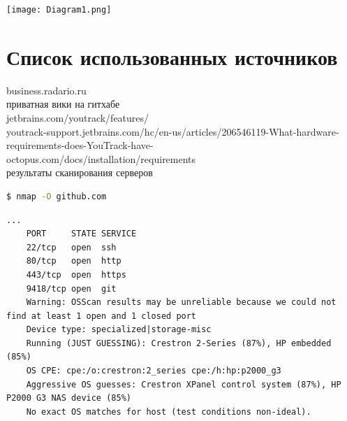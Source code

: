 \documentclass{article}
\begin{document}
\texttt{[image: Diagram1.png]}

\pagebreak

\section{Список использованных источников}
business.radario.ru\\
приватная вики на гитхабе\\
jetbrains.com/youtrack/features/\\
youtrack-support.jetbrains.com/hc/en-us/articles/206546119-What-hardware-requirements-does-YouTrack-have-\\
octopus.com/docs/installation/requirements\\

результаты сканирования серверов
\begin{lstlisting}[language=bash, basicstyle=\ttfamily\small]
    $ nmap -O github.com
\end{lstlisting}
\begin{lstlisting}[frame=lines, basicstyle=\ttfamily\small]
    ...
    PORT     STATE SERVICE
    22/tcp   open  ssh
    80/tcp   open  http
    443/tcp  open  https
    9418/tcp open  git
    Warning: OSScan results may be unreliable because we could not find at least 1 open and 1 closed port
    Device type: specialized|storage-misc
    Running (JUST GUESSING): Crestron 2-Series (87%), HP embedded (85%)
    OS CPE: cpe:/o:crestron:2_series cpe:/h:hp:p2000_g3
    Aggressive OS guesses: Crestron XPanel control system (87%), HP P2000 G3 NAS device (85%)
    No exact OS matches for host (test conditions non-ideal).
\end{lstlisting}
\end{document}
